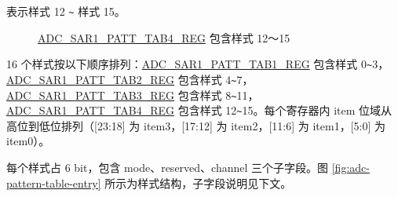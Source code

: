 \documentclass[main\_\_CN.tex]{subfiles}
\begin{document}
%
%
%
%
\begin{regdesc}\begin{reglist}
\item [item \regindex{x}] 表示样式 12 \verb+~+ 样式 15。
\end{reglist}\end{regdesc}
\vspace{-2em}
\begin{figure}[H]
    \centering
    \caption{\hyperref[regdesc:ADCSAR1PATTTAB4REG]{ADC\_SAR1\_PATT\_TAB4\_REG} 包含样式 12～15}
    \label{fig:adc-sar1-patt-tab4-reg-entry12-entry15}
\end{figure}

16 个样式按以下顺序排列：\hyperref[regdesc:ADCSAR1PATTTAB1REG]{ADC\_SAR1\_PATT\_TAB1\_REG} 包含样式 0\verb+~+3，\hyperref[regdesc:ADCSAR1PATTTAB2REG]{ADC\_SAR1\_PATT\_TAB2\_REG} 包含样式 4\verb+~+7，\hyperref[regdesc:ADCSAR1PATTTAB3REG]{ADC\_SAR1\_PATT\_TAB3\_REG} 包含样式 8\verb+~+11，\hyperref[regdesc:ADCSAR1PATTTAB4REG]{ADC\_SAR1\_PATT\_TAB4\_REG} 包含样式 12\verb+~+15。每个寄存器内 item 位域从高位到低位排列（[23:18] 为 item3，[17:12] 为 item2，[11:6] 为 item1，[5:0] 为 item0）。

每个样式占 6 bit，包含 mode、reserved、channel 三个子字段。图 \ref{fig:adc-pattern-table-entry} 所示为样式结构，子字段说明见下文。
\end{document}
